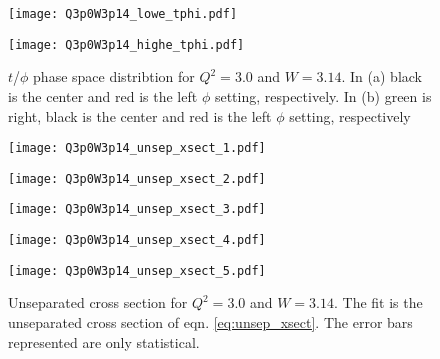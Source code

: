 \clearpage


\begin{figure}
  \centering
  \begin{minipage}[b]{0.48\linewidth}
    \texttt{[image: Q3p0W3p14\_lowe\_tphi.pdf]}
  \end{minipage}
  \hfill
  \begin{minipage}[b]{0.48\linewidth}
    \texttt{[image: Q3p0W3p14\_highe\_tphi.pdf]}
  \end{minipage}  
  \caption{$t$/$\phi$ phase space distribtion for $Q^2=3.0$ and $W=3.14$. In (a) black is the center and red is the left $\phi$ setting, respectively. In (b) green is right, black is the center and red is the left $\phi$ setting, respectively}
  \label{fig:Q3p0W3p14_tphi}
\end{figure}

\begin{figure}
  \centering
  \begin{minipage}[b]{0.48\linewidth}
    \texttt{[image: Q3p0W3p14\_unsep\_xsect\_1.pdf]}
  \end{minipage}
  \hfill
  \begin{minipage}[b]{0.48\linewidth}
    \texttt{[image: Q3p0W3p14\_unsep\_xsect\_2.pdf]}
  \end{minipage}
  \begin{minipage}[b]{0.48\linewidth}
    \texttt{[image: Q3p0W3p14\_unsep\_xsect\_3.pdf]}
  \end{minipage}
  \hfill
  \begin{minipage}[b]{0.48\linewidth}
    \texttt{[image: Q3p0W3p14\_unsep\_xsect\_4.pdf]}
  \end{minipage}
  \begin{minipage}[b]{0.48\linewidth}
    \texttt{[image: Q3p0W3p14\_unsep\_xsect\_5.pdf]}
  \end{minipage}  
  \caption{Unseparated cross section for $Q^2=3.0$ and $W=3.14$. The fit is the unseparated cross section of eqn. \ref{eq:unsep_xsect}. The error bars represented are only statistical.}
  \label{fig:Q3p0W3p14_unsep_xsect}
\end{figure}

